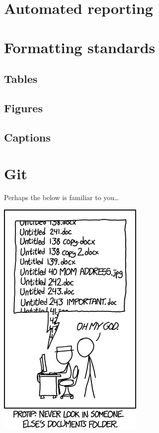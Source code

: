 \documentclass[
]{book}
\begin{document}
\hypertarget{automated-reporting}{%
\chapter{Automated reporting}\label{automated-reporting}}

\hypertarget{formatting-standards}{%
\chapter{Formatting standards}\label{formatting-standards}}

\hypertarget{tables}{%
\section{Tables}\label{tables}}

\hypertarget{figures}{%
\section{Figures}\label{figures}}

\hypertarget{captions}{%
\section{Captions}\label{captions}}

\hypertarget{git}{%
\chapter{Git}\label{git}}

Perhaps the below is familiar to you\ldots{}

\includegraphics{img/version_control.png}
\end{document}
